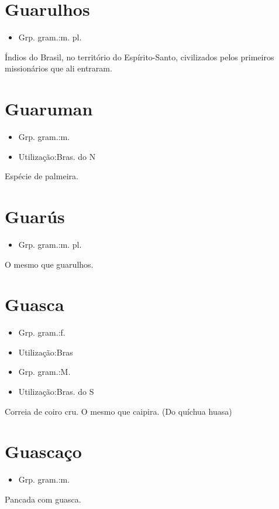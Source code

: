 \section{Guarulhos}
\begin{itemize}
\item {Grp. gram.:m. pl.}
\end{itemize}
Índios do Brasil, no território do Espírito-Santo, civilizados pelos primeiros missionários que ali entraram.
\section{Guaruman}
\begin{itemize}
\item {Grp. gram.:m.}
\end{itemize}
\begin{itemize}
\item {Utilização:Bras. do N}
\end{itemize}
Espécie de palmeira.
\section{Guarús}
\begin{itemize}
\item {Grp. gram.:m. pl.}
\end{itemize}
O mesmo que \textunderscore guarulhos\textunderscore .
\section{Guasca}
\begin{itemize}
\item {Grp. gram.:f.}
\end{itemize}
\begin{itemize}
\item {Utilização:Bras}
\end{itemize}
\begin{itemize}
\item {Grp. gram.:M.}
\end{itemize}
\begin{itemize}
\item {Utilização:Bras. do S}
\end{itemize}
Correia de coiro cru.
O mesmo que \textunderscore caipira\textunderscore .
(Do quíchua \textunderscore huasa\textunderscore )
\section{Guascaço}
\begin{itemize}
\item {Grp. gram.:m.}
\end{itemize}
Pancada com guasca.
